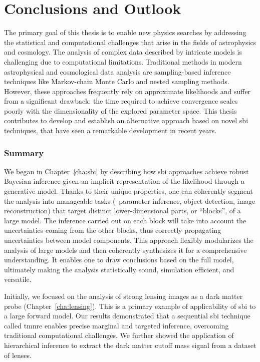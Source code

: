 \chapter{Conclusions and Outlook} \label{cha:conclusions}

The primary goal of this thesis is to enable new physics searches by addressing the statistical and computational challenges that arise in the fields of astrophysics and cosmology. 
The analysis of complex data described by intricate models is challenging due to computational limitations. Traditional methods in modern astrophysical and cosmological data analysis are sampling-based inference techniques like Markov-chain Monte Carlo and nested sampling methods. However, these approaches frequently rely on approximate likelihoods and suffer from a significant drawback: the time required to achieve convergence scales poorly with the dimensionality of the explored parameter space. This thesis contributes to develop and establish an alternative approach based on novel \gls*{sbi} techniques, that have seen a remarkable development in recent years. 

\subsection*{Summary}

We began in Chapter~\ref{cha:sbi} by describing how \gls*{sbi} approaches achieve robust Bayesian inference given an implicit representation of the likelihood through a generative model. Thanks to their unique properties, one can coherently segment the analysis into manageable tasks (\eg~parameter inference, object detection, image reconstruction) that target distinct lower-dimensional parts, or “blocks”, of a large model. The inference carried out on each block will take into account the uncertainties coming from the other blocks, thus correctly propagating uncertainties between model components. This approach flexibly modularizes the analysis of large models and then coherently synthesizes it for a comprehensive understanding. It enables one to draw conclusions based on the full model, ultimately making the analysis statistically sound, simulation efficient, and versatile. 

Initially, we focused on the analysis of strong lensing images as a dark matter probe (Chapter~\ref{cha:lensing}). This is a primary example of applicability of \gls*{sbi} to a large forward model. Our results demonstrated that a sequential \gls*{sbi} technique called \gls*{tmnre} enables precise marginal and targeted inference, overcoming traditional computational challenges. We further showed the application of hierarchical inference to extract the dark matter cutoff mass signal from a dataset of lenses.

